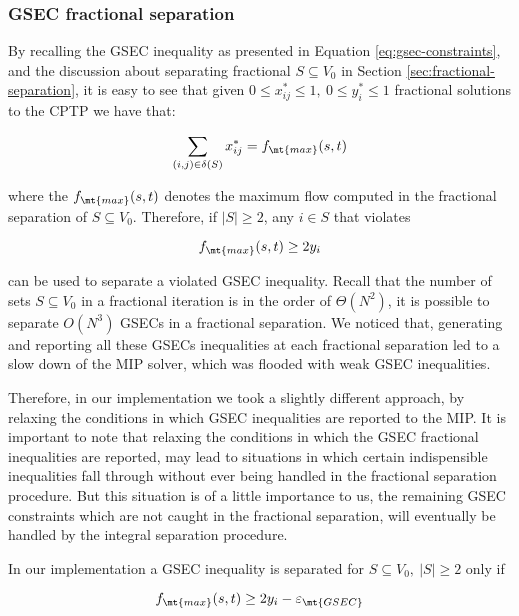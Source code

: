 \subsubsection{GSEC fractional separation}\label{sec:gsec-fractional-separation}

By recalling the GSEC inequality as presented in Equation \eqref{eq:gsec-constraints}, and the discussion about separating fractional $S \subseteq V_0$ in Section \ref{sec:fractional-separation}, it is easy to see that given $0 \le x^*_{ij} \le 1,\ 0 \le y^*_{i} \le 1$ fractional solutions to the CPTP we have that:

\begin{equation}
	\sum_{(i, j) \in \delta(S)} x^*_{ij} = f_{\mt{max}}(s, t)
\end{equation}

where the $f_{\mt{max}}(s, t)$ denotes the maximum flow computed in the fractional separation of $S \subseteq V_0$.
Therefore, if $|S| \ge 2$, any $i \in S$ that violates

\begin{equation}
	f_{\mt{max}}(s, t) \ge 2 y_i
\end{equation}

can be used to separate a violated GSEC inequality.
Recall that the number of sets $S \subseteq V_0$ in a fractional iteration is in the order of $\Theta(N^2)$, it is possible to separate $O(N^3)$ GSECs in a fractional separation.
We noticed that, generating and reporting all these GSECs inequalities at each fractional separation led to a slow down of the MIP solver, which was flooded with weak GSEC inequalities.

Therefore, in our implementation we took a slightly different approach, by relaxing the conditions in which GSEC inequalities are reported to the MIP.
It is important to note that relaxing the conditions in which the GSEC fractional inequalities are reported, may lead to situations in which certain indispensible inequalities fall through without ever being handled in the fractional separation procedure.
But this situation is of a little importance to us, the remaining GSEC constraints which are not caught in the fractional separation, will eventually be handled by the integral separation procedure.

In our implementation a GSEC inequality is separated for $S \subseteq V_0,\ |S| \ge 2$ only if

\begin{equation}
	f_{\mt{max}}(s, t) \ge 2 y_i - \varepsilon_{\mt{GSEC}}
\end{equation}

